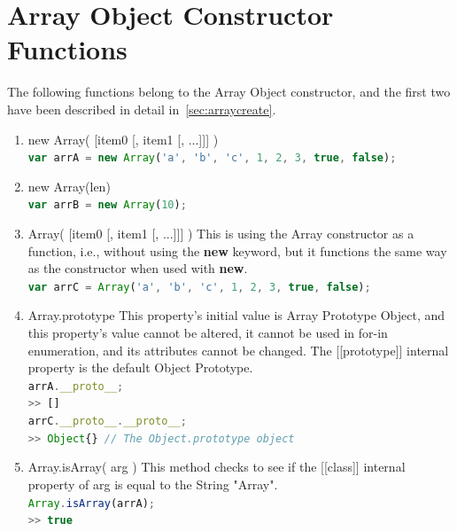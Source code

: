 \documentclass[a4paper,11pt,twoside]{report}
\def\jsinline{\lstinline[language=JavaScript, basicstyle=\small]}
\begin{document}
\section{Array Object Constructor Functions}
The following functions belong to the Array Object constructor, and the first two have been described in detail in~\ref{sec:arraycreate}.
\begin{enumerate}
\item new Array( [item0 [, item1 [, ...]]] )\\
\jsinline|var arrA = new Array('a', 'b', 'c', 1, 2, 3, true, false);|
\item new Array(len)\\
\jsinline|var arrB = new Array(10);|
\item Array( [item0 [, item1 [, ...]]] ) \newline
This is using the Array constructor as a function, i.e., without using the \textbf{new} keyword, but it functions the same way as the constructor when used with \textbf{new}.\\
\jsinline|var arrC = Array('a', 'b', 'c', 1, 2, 3, true, false);|
\item Array.prototype \newline
This property's initial value is Array Prototype Object, and this property's value cannot be altered, it cannot be used in for-in enumeration, and its attributes cannot be changed. The [[prototype]] internal property is the default Object Prototype.\\
\jsinline|arrA.__proto__;|\\
\jsinline|>> []|\\
\jsinline|arrC.__proto__.__proto__;| \\
\jsinline|>> Object{} // The Object.prototype object|
\item Array.isArray( arg ) \newline
This method checks to see if the [[class]] internal property of arg is equal to the String "Array". \\
\jsinline|Array.isArray(arrA);| \\
\jsinline|>> true|
\end{enumerate}
\end{document}
